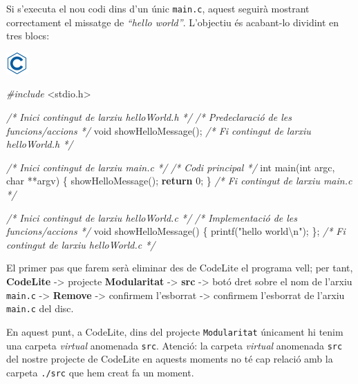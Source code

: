 \documentclass[
]{book}
\newenvironment{Shaded}{\begin{snugshade}}{\end{snugshade}}
\newcommand{\CommentTok}[1]{\textcolor[rgb]{0.56,0.35,0.01}{\textit{#1}}}
\newcommand{\ControlFlowTok}[1]{\textcolor[rgb]{0.13,0.29,0.53}{\textbf{#1}}}
\newcommand{\DataTypeTok}[1]{\textcolor[rgb]{0.13,0.29,0.53}{#1}}
\newcommand{\DecValTok}[1]{\textcolor[rgb]{0.00,0.00,0.81}{#1}}
\newcommand{\ImportTok}[1]{#1}
\newcommand{\NormalTok}[1]{#1}
\newcommand{\PreprocessorTok}[1]{\textcolor[rgb]{0.56,0.35,0.01}{\textit{#1}}}
\newcommand{\SpecialCharTok}[1]{\textcolor[rgb]{0.00,0.00,0.00}{#1}}
\newcommand{\StringTok}[1]{\textcolor[rgb]{0.31,0.60,0.02}{#1}}
\begin{document}
Si s'executa el nou codi dins d'un únic \texttt{main.c}, aquest seguirà mostrant correctament el missatge de \emph{``hello world''}. L'objectiu és acabant-lo dividint en tres blocs:

\includegraphics{./img/c.png}

\begin{Shaded}
\begin{Highlighting}[]
\PreprocessorTok{\#include }\ImportTok{\textless{}stdio.h\textgreater{}}

\CommentTok{/* Inici contingut de l\textquotesingle{}arxiu helloWorld.h */}
\CommentTok{/* Predeclaració de les funcions/accions */}
\DataTypeTok{void}\NormalTok{ showHelloMessage();}
\CommentTok{/* Fi contingut de l\textquotesingle{}arxiu helloWorld.h */}

\CommentTok{/* Inici contingut de l\textquotesingle{}arxiu main.c */}
\CommentTok{/* Codi principal */}
\DataTypeTok{int}\NormalTok{ main(}\DataTypeTok{int}\NormalTok{ argc, }\DataTypeTok{char}\NormalTok{ **argv) \{}
\NormalTok{    showHelloMessage();}
    \ControlFlowTok{return} \DecValTok{0}\NormalTok{;}
\NormalTok{\}}
\CommentTok{/* Fi contingut de l\textquotesingle{}arxiu main.c */}

\CommentTok{/* Inici contingut de l\textquotesingle{}arxiu helloWorld.c */}
\CommentTok{/* Implementació de les funcions/accions */}
\DataTypeTok{void}\NormalTok{ showHelloMessage() \{}
\NormalTok{    printf(}\StringTok{"hello world}\SpecialCharTok{\textbackslash{}n}\StringTok{"}\NormalTok{);}
\NormalTok{\};}
\CommentTok{/* Fi contingut de l\textquotesingle{}arxiu helloWorld.c */}
\end{Highlighting}
\end{Shaded}

El primer pas que farem serà eliminar des de CodeLite el programa vell; per tant, \textbf{CodeLite} -\textgreater{} projecte \textbf{Modularitat} -\textgreater{} \textbf{src} -\textgreater{} botó dret sobre el nom de l'arxiu \texttt{main.c} -\textgreater{} \textbf{Remove} -\textgreater{} confirmem l'esborrat -\textgreater{} confirmem l'esborrat de l'arxiu \texttt{main.c} del disc.

En aquest punt, a CodeLite, dins del projecte \texttt{Modularitat} únicament hi tenim una carpeta \emph{virtual} anomenada \texttt{src}. Atenció: la carpeta \emph{virtual} anomenada \texttt{src} del nostre projecte de CodeLite en aquests moments no té cap relació amb la carpeta \texttt{./src} que hem creat fa un moment.
\end{document}
